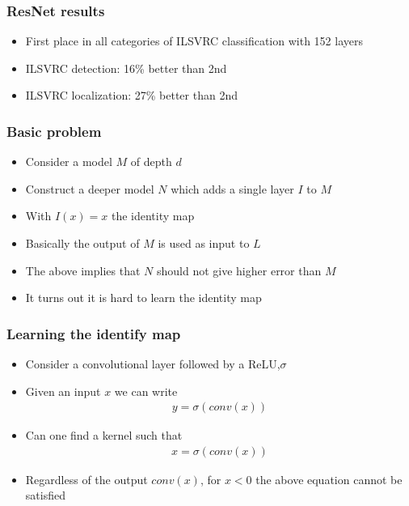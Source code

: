 \documentclass{beamer}
\begin{document}
\begin{frame}
	\frametitle{ResNet results}
\begin{itemize}
	\item First place in all categories of ILSVRC classification with 152 layers
	\item ILSVRC detection: 16\% better than 2nd
	\item ILSVRC localization: 27\% better than 2nd
\end{itemize}
	

\end{frame}



\begin{frame}
    \frametitle{Basic problem}
\begin{itemize}
    \item Consider a model $M$ of depth $d$
    \item Construct a deeper model $N$ which adds a single layer $I$ to $M$
    \item With $I(x)=x$ the identity map
    \item Basically the output of $M$ is used as input to $L$
    \item The above implies that $N$ should not give higher error than $M$
    \item It turns out it is hard to learn the identity map
\end{itemize}
\end{frame}
\begin{frame}
    \frametitle{Learning the identify map}

\begin{itemize}
    \item Consider a convolutional layer followed by a ReLU,$\sigma$
    \item Given an input $x$ we can write
    \begin{align*}
        y=\sigma(conv(x))
    \end{align*}
    \item Can one find a kernel such that
    \begin{align*}
        x=\sigma(conv(x))
    \end{align*}
     \item  Regardless of the output $conv(x)$, for $x<0$ the above equation cannot be satisfied 
\end{itemize}    

\end{frame}
\end{document}
